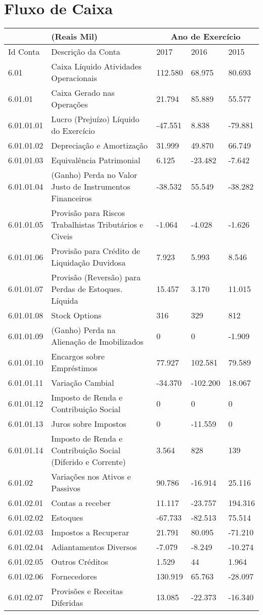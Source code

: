 \vspace*{-60pt}
\section{Fluxo de Caixa}
\label{sec:fluxoDeCaixa}

\begin{center}
\begin{longtable}{p{}|p{}|p{}|p{}|p{}}
\hline 
 & (Reais Mil) & \multicolumn{3}{c}{Ano de Exercício}\tabularnewline
\hline 
Id Conta & Descrição da Conta & 2017 & 2016 & 2015\tabularnewline
\hline 
6.01 & Caixa Líquido Atividades Operacionais & 112.580 & 68.975 & 80.693\tabularnewline
6.01.01 & Caixa Gerado nas Operações & 21.794 & 85.889 & 55.577\tabularnewline
6.01.01.01 & Lucro (Prejuízo) Líquido do Exercício & -47.551 & 8.838 & -79.881\tabularnewline
6.01.01.02 & Depreciação e Amortização & 31.999 & 49.870 & 66.749\tabularnewline
6.01.01.03 & Equivalência Patrimonial & 6.125 & -23.482 & -7.642\tabularnewline
6.01.01.04 & (Ganho) Perda no Valor Justo de Instrumentos Financeiros & -38.532 & 55.549 & -38.282\tabularnewline
6.01.01.05 & Provisão para Riscos Trabalhistas Tributários e Civeis & -1.064 & -4.028 & -1.626\tabularnewline
6.01.01.06 & Provisão para Crédito de Liquidação Duvidosa & 7.923 & 5.993 & 8.546\tabularnewline
6.01.01.07 & Provisão (Reversão) para Perdas de Estoques. Líquida & 15.457 & 3.170 & 11.015\tabularnewline
6.01.01.08 & Stock Options & 316 & 329 & 812\tabularnewline
6.01.01.09 & (Ganho) Perda na Alienação de Imobilizados & 0 & 0 & -1.909\tabularnewline
6.01.01.10 & Encargos sobre Empréstimos & 77.927 & 102.581 & 79.589\tabularnewline
6.01.01.11 & Variação Cambial & -34.370 & -102.200 & 18.067\tabularnewline
6.01.01.12 & Imposto de Renda e Contribuição Social & 0 & 0 & 0\tabularnewline
6.01.01.13 & Juros sobre Impostos & 0 & -11.559 & 0\tabularnewline
6.01.01.14 & Imposto de Renda e Contribuição Social (Diferido e Corrente) & 3.564 & 828 & 139\tabularnewline
6.01.02 & Variações nos Ativos e Passivos & 90.786 & -16.914 & 25.116\tabularnewline
6.01.02.01 & Contas a receber & 11.117 & -23.757 & 194.316\tabularnewline
6.01.02.02 & Estoques & -67.733 & -82.513 & 75.514\tabularnewline
6.01.02.03 & Impostos a Recuperar & 21.791 & 80.095 & -71.210\tabularnewline
6.01.02.04 & Adiantamentos Diversos & -7.079 & -8.249 & -10.274\tabularnewline
6.01.02.05 & Outros Créditos & 1.529 & 44 & 1.964\tabularnewline
6.01.02.06 & Fornecedores & 130.919 & 65.763 & -28.097\tabularnewline
6.01.02.07 & Provisões e Receitas Diferidas & 13.085 & -22.373 & -16.340\tabularnewline

\end{longtable}
\end{center}
